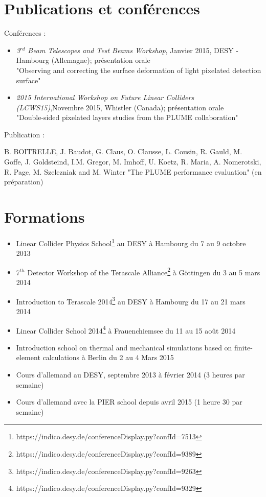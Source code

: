 \documentclass[a4papper, 10pt]{article}
\begin{document}
 
  \section*{Publications et conférences}

  Conférences :
  \begin{itemize}
    \item \textit{3$^{rd}$ Beam Telescopes and Test Beams Workshop}, Janvier 2015, DESY - Hambourg (Allemagne); présentation orale\\
    "Observing and correcting the surface deformation of light pixelated detection surface"
    \item \textit{2015 International Workshop on Future Linear Colliders (LCWS15)},Novembre 2015,  Whistler (Canada); présentation orale\\
    "Double-sided pixelated layers studies from the PLUME collaboration"
  \end{itemize}
  Publication :
  
  B. BOITRELLE, J. Baudot, G. Claus, O. Clausse, L. Cousin, R. Gauld, M. Goffe, J. Goldsteind, I.M. Gregor, M. Imhoff, U. Koetz, R. Maria, A. Nomerotski, R. Page, M. Szelezniak and M. Winter "The PLUME performance evaluation" (en préparation)

  \section*{Formations}
 
  \begin{itemize}
    \item Linear Collider Physics School\footnote{https://indico.desy.de/conferenceDisplay.py?confId=7513} au DESY à Hambourg du 7 au 9 octobre 2013
    \item 7$^{th}$ Detector Workshop of the Terascale Alliance\footnote{https://indico.desy.de/conferenceDisplay.py?confId=9389} à Göttingen du 3 au 5 mars 2014
    \item Introduction to Terascale 2014\footnote{https://indico.desy.de/conferenceDisplay.py?confId=9263} au DESY à Hambourg du 17 au 21 mars 2014
    \item Linear Collider School 2014\footnote{https://indico.desy.de/conferenceDisplay.py?confId=9329} à Frauenchiemsee du 11 au 15 août 2014
    \item Introduction school on thermal and mechanical simulations based on finite-element calculations à Berlin du 2 au 4 Mars 2015
    \item Cours d'allemand au DESY, septembre 2013 à février 2014 (3 heures par semaine)
    \item Cours d'allemand avec la PIER school depuis avril 2015 (1 heure 30 par semaine)
  \end{itemize}

  
	
 
\end{document}
